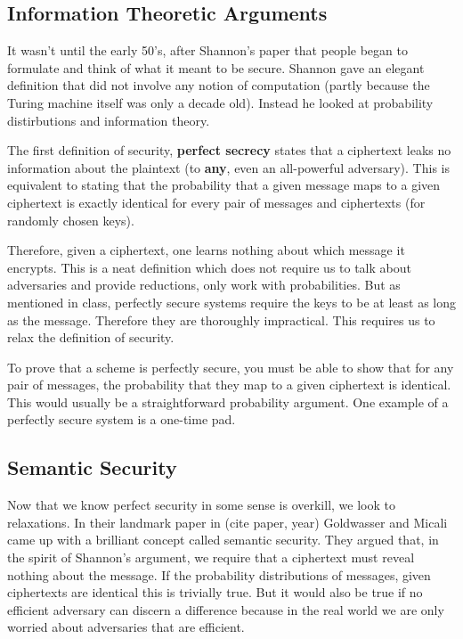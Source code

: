 \documentclass[A4, 11pt]{article}
\newcommand{\todo}[1]{\small{\sc #1}\normalsize}
\begin{document}
\subsection{Information Theoretic Arguments}
It wasn't until the early 50's, after Shannon's paper that people began to
formulate and think of what it meant to be secure. Shannon gave an elegant
definition that did not involve any notion of computation (partly because
the Turing machine itself was only a decade old). Instead he looked at
probability distirbutions and information theory.

The first definition of security, {\bf perfect secrecy} states that a
ciphertext leaks no information about the plaintext (to {\bf any}, even an
all-powerful adversary). This is equivalent to stating that the probability
that a given message maps to a given ciphertext is exactly identical for
every pair of messages and ciphertexts (for randomly chosen keys). 

Therefore, given a ciphertext, one learns nothing about which message it
encrypts. This is a neat definition which does not require us to talk about
adversaries and provide reductions, only work with probabilities. But as
mentioned in class, perfectly secure systems require the keys to be at
least as long as the message. Therefore they are thoroughly impractical.
This requires us to relax the definition of security.

\par
To prove that a scheme is perfectly secure, you must be able to show that
for any pair of messages, the probability that they map to a given
ciphertext is identical. This would usually be a straightforward
probability argument. One example of a perfectly secure system is a
one-time pad.  

\subsection{Semantic Security}
Now that we know perfect security in some sense is overkill, we look to
relaxations. In their landmark paper in (\todo{cite paper, year})
Goldwasser and Micali came up with a brilliant concept called semantic
security. They argued that, in the spirit of Shannon's argument, we require
that a ciphertext must reveal nothing about the message. If the probability
distributions of messages, given ciphertexts are identical this is
trivially true. But it would also be true if no efficient adversary can
discern a difference because in the real world we are only worried about
adversaries that are efficient. 
\end{document}
